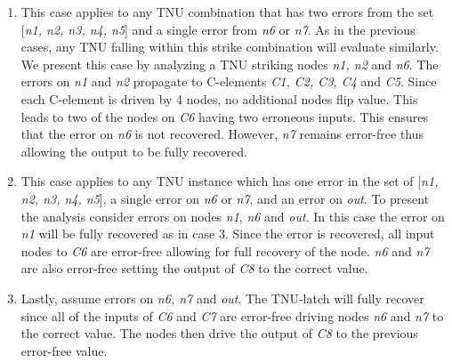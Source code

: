 \begin{enumerate}
	\item This case applies to any TNU combination that has two errors from the set [\textit{n1, n2, n3, n4, n5}] and a single error from \textit{n6} or \textit{n7}. As in the previous cases, any TNU falling within this strike combination will evaluate similarly. We present this case by analyzing a TNU striking nodes \textit{n1, n2} and \textit{n6}. The errors on \textit{n1} and \textit{n2} propagate to C-elements \textit{C1, C2, C3, C4} and \textit{C5}. Since each C-element is driven by 4 nodes, no additional nodes flip value. This leads to two of the nodes on \textit{C6} having two erroneous inputs. This ensures that the error on \textit{n6} is not recovered. However, \textit{n7} remains error-free thus allowing the output to be fully recovered. 
	
	\item This case applies to any TNU instance which has one error in the set of [\textit{n1, n2, n3, n4, n5}], a single error on \textit{n6} or \textit{n7}, and an error on \textit{out}. To present the analysis consider errors on nodes \textit{n1}, \textit{n6} and \textit{out}. In this case the error on \textit{n1} will be fully recovered as in case 3. Since the error is recovered, all input nodes to \textit{C6} are error-free allowing for full recovery of the node. \textit{n6} and \textit{n7} are also error-free setting the output of \textit{C8} to the correct value. 
	
	\item Lastly, assume errors on \textit{n6, n7} and \textit{out}. The TNU-latch will fully recover since all of the inputs of \textit{C6} and \textit{C7} are error-free driving nodes \textit{n6} and \textit{n7} to the correct value. The nodes then drive the output of \textit{C8} to the previous error-free value.
	
\end{enumerate}

